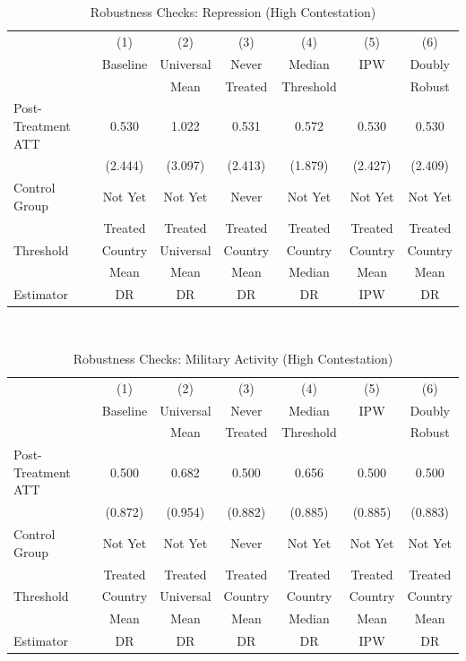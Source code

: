 \documentclass[bibtex]{article}
\begin{document}
{\begin{table}[H]
\centering
\caption{Robustness Checks:  Repression  (High  Contestation)}
\label{tab:robust_ rep _ high }
\begin{tabular}{lcccccc}
\toprule
 & (1) & (2) & (3) & (4) & (5) & (6) \\
 & Baseline & Universal & Never & Median & IPW & Doubly \\
 &  & Mean & Treated & Threshold &  & Robust \\
\midrule
Post-Treatment ATT &  0.530  &  1.022  &  0.531  &  0.572  &  0.530  &  0.530  \\
 &  (2.444)  &  (3.097)  &  (2.413)  &  (1.879)  &  (2.427)  &  (2.409)  \\
\midrule
Control Group & Not Yet & Not Yet & Never & Not Yet & Not Yet & Not Yet \\
 & Treated & Treated & Treated & Treated & Treated & Treated \\
Threshold & Country & Universal & Country & Country & Country & Country \\
 & Mean & Mean & Mean & Median & Mean & Mean \\
Estimator & DR & DR & DR & DR & IPW & DR \\
\bottomrule
\end{tabular}\\
\end{table}


\begin{table}[H]
\centering
\caption{Robustness Checks:  Military Activity  (High  Contestation)}
\label{tab:robust_ mil _ high }
\begin{tabular}{lcccccc}
\toprule
 & (1) & (2) & (3) & (4) & (5) & (6) \\
 & Baseline & Universal & Never & Median & IPW & Doubly \\
 &  & Mean & Treated & Threshold &  & Robust \\
\midrule
Post-Treatment ATT &  0.500  &  0.682  &  0.500  &  0.656  &  0.500  &  0.500  \\
 &  (0.872)  &  (0.954)  &  (0.882)  &  (0.885)  &  (0.885)  &  (0.883)  \\
\midrule
Control Group & Not Yet & Not Yet & Never & Not Yet & Not Yet & Not Yet \\
 & Treated & Treated & Treated & Treated & Treated & Treated \\
Threshold & Country & Universal & Country & Country & Country & Country \\
 & Mean & Mean & Mean & Median & Mean & Mean \\
Estimator & DR & DR & DR & DR & IPW & DR \\
\bottomrule
\end{tabular}\\
\end{table}


}
\end{document}
